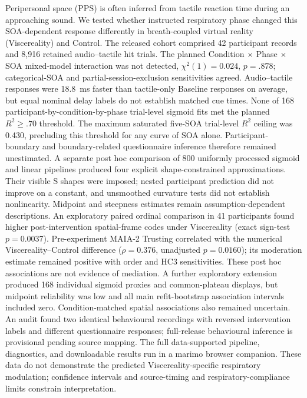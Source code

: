 Peripersonal space (PPS) is often inferred from tactile reaction time during an approaching sound. We tested whether instructed respiratory phase changed this SOA-dependent response differently in breath-coupled virtual reality (Viscereality) and Control. The released cohort comprised 42 participant records and 8{,}916 retained audio--tactile hit trials. The planned Condition $\times$ Phase $\times$ SOA mixed-model interaction was not detected, $\chi^{2}(1)=0.024$, $p=.878$; categorical-SOA and partial-session-exclusion sensitivities agreed. Audio--tactile responses were 18.8~ms faster than tactile-only Baseline responses on average, but equal nominal delay labels do not establish matched cue times. None of 168 participant-by-condition-by-phase trial-level sigmoid fits met the planned $R^{2}\geq .70$ threshold. The maximum saturated five-SOA trial-level $R^{2}$ ceiling was 0.430, precluding this threshold for any curve of SOA alone. Participant-boundary and boundary-related questionnaire inference therefore remained unestimated. A separate post hoc comparison of 800 uniformly processed sigmoid and linear pipelines produced four explicit shape-constrained approximations. Their visible S shapes were imposed; nested participant prediction did not improve on a constant, and unsmoothed curvature tests did not establish nonlinearity. Midpoint and steepness estimates remain assumption-dependent descriptions. An exploratory paired ordinal comparison in 41 participants found higher post-intervention spatial-frame codes under Viscereality (exact sign-test $p=0.0037$). Pre-experiment MAIA-2 Trusting correlated with the numerical Viscereality--Control difference ($\rho=0.376$, unadjusted $p=0.0160$); its moderation estimate remained positive with order and HC3 sensitivities. These post hoc associations are not evidence of mediation. A further exploratory extension produced 168 individual sigmoid proxies and common-plateau displays, but midpoint reliability was low and all main refit-bootstrap association intervals included zero. Condition-matched spatial associations also remained uncertain. An audit found two identical behavioural recordings with reversed intervention labels and different questionnaire responses; full-release behavioural inference is provisional pending source mapping. The full data-supported pipeline, diagnostics, and downloadable results run in a marimo browser companion. These data do not demonstrate the predicted Viscereality-specific respiratory modulation; confidence intervals and source-timing and respiratory-compliance limits constrain interpretation.
